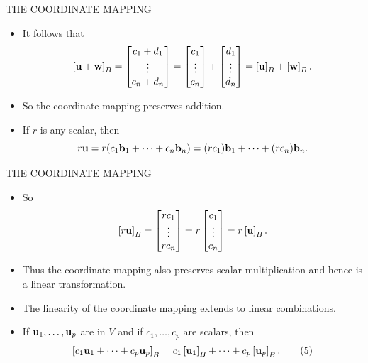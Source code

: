 \begin{frame}[shrink=8]{THE COORDINATE MAPPING}
\begin{itemize}
\item It follows that
\[
\left[\mathbf{u}+\mathbf{w}\right]_{B}
=\begin{bmatrix}c_1+d_1\\\vdots\\c_n+d_n\end{bmatrix}
=\begin{bmatrix}c_1\\\vdots\\c_n\end{bmatrix}
+\begin{bmatrix}d_1\\\vdots\\d_n\end{bmatrix}
=\left[\mathbf{u}\right]_{B}+\left[\mathbf{w}\right]_{B}.
\]
\item So the coordinate mapping preserves addition.
\item If $r$ is any scalar, then
\[
r\mathbf{u}=r(c_1\mathbf{b}_1+\cdots+c_n\mathbf{b}_n)
=(rc_1)\mathbf{b}_1+\cdots+(rc_n)\mathbf{b}_n.
\]
\end{itemize}
\end{frame}

\begin{frame}[shrink=10]{THE COORDINATE MAPPING}
\begin{itemize}
\item So
\[
\left[r\mathbf{u}\right]_{B}=\begin{bmatrix}rc_1\\\vdots\\rc_n\end{bmatrix}
=r\begin{bmatrix}c_1\\\vdots\\c_n\end{bmatrix}
=r\left[\mathbf{u}\right]_{B}.
\]
\item Thus the coordinate mapping also preserves scalar multiplication and hence is a linear transformation.
\item The linearity of the coordinate mapping extends to linear combinations.
\item If $\mathbf{u}_1,\ldots,\mathbf{u}_p$ are in $V$ and if $c_1,\ldots,c_p$ are scalars, then
\begin{equation}
\left[c_1\mathbf{u}_1+\cdots+c_p\mathbf{u}_p\right]_{B}
=c_1\left[\mathbf{u}_1\right]_{B}+\cdots+c_p\left[\mathbf{u}_p\right]_{B}. \tag{5}
\end{equation}
\end{itemize}
\end{frame}

